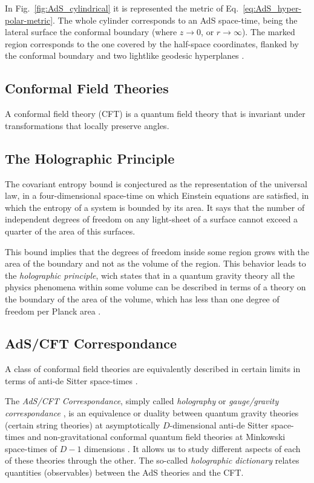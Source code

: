 \documentclass[twocolumn]{revtex4}
\begin{document}
In Fig.~\ref{fig:AdS_cylindrical} it is represented the metric of Eq.~\ref{eq:AdS_hyper-polar-metric}. The whole cylinder corresponds to an AdS space-time, being the lateral surface the conformal boundary (where $z \to 0$, or $r \to \infty$). The marked region corresponds to the one covered by the half-space coordinates, flanked by the conformal boundary and two lightlike geodesic hyperplanes \cite{}.


\subsection{Conformal Field Theories} \label{ss:CFT}

A conformal field theory (CFT) is a quantum field theory that is invariant under transformations that locally preserve angles.


\subsection{The Holographic Principle} \label{ss:Holography}

The covariant entropy bound \cite{bousso_covariant_1999} is conjectured as the representation of the universal law, in a four-dimensional space-time on which Einstein equations are satisfied, in which the entropy of a system is bounded by its area. It says that the number of independent degrees of freedom on any light-sheet of a surface cannot exceed a quarter of the area of this surfaces.

This bound implies that the degrees of freedom inside some region grows with the area of the boundary and not as the volume of the region. This behavior leads to the \textit{holographic principle}, wich states that in a quantum gravity theory all the physics phenomena within some volume can be described in terms of a theory on the boundary of the area of the volume, which has less than one degree of freedom per Planck area \cite{t_hooft_dimensional_2009}.


\subsection{AdS/CFT Correspondance} \label{ss:AdS/CFT}

A class of conformal field theories are equivalently described in certain limits in terms of anti-de Sitter space-times \cite{rangamani_holographic_2017}.

The \textit{AdS/CFT Correspondance}, simply called \textit{holography} or \textit{gauge/gravity correspondance} \cite{ramallo_introduction_2013}, is an equivalence or duality between quantum gravity theories (certain string theories) at asymptotically $D$-dimensional anti-de Sitter space-times and non-gravitational conformal quantum field theories at Minkowski space-times of $D-1$ dimensions \cite{maldacena_large_1999}. It allows us to study different aspects of each of these theories through the other. The so-called \textit{holographic dictionary} relates quantities (observables) between the AdS theories and the CFT. %
\end{document}
